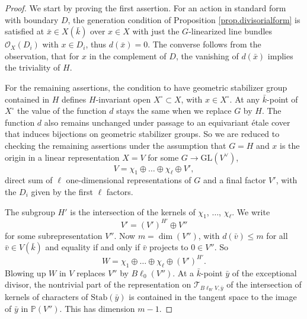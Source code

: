 \documentclass[10pt,a4paper]{amsart}
\newcommand{\GL}{{\mathrm{GL}}}
\newcommand{\bP}{{\mathbb P}}
\newcommand{\cO}{{\mathcal O}}
\begin{document}
\begin{proof}
We start by proving the first assertion.
For an action in standard form with boundary $D$, the generation condition of Proposition \ref{prop.divisorialform} is satisfied at $\bar x\in X(\bar k)$
over $x\in X$ with just the $G$-linearized line bundles $\cO_X(D_i)$ with $x\in D_i$,
thus $d(\bar x)=0$.
The converse follows from the observation, that for $x$ in the complement of $D$, the vanishing of $d(\bar x)$ implies the triviality of $H$.

For the remaining assertions, the condition to have geometric stabilizer group contained in $H$ defines $H$-invariant open $X^\circ\subset X$, with $x\in X^\circ$.
At any $\bar k$-point of $X^\circ$ the value of the function $d$ stays the same when we replace $G$ by $H$.
The function $d$ also remains unchanged under passage to an equivariant \'etale cover that induces bijections on geometric stabilizer groups.
So we are reduced to checking the remaining assertions under the assumption that
$G=H$ and
$x$ is the origin in a linear representation $X=V$ for some $G\to \GL(V^\vee)$,
\[ V=\chi_1\oplus\dots\oplus \chi_\ell\oplus V', \]
direct sum of $\ell$ one-dimensional representations of $G$
and a final factor $V'$, with
the $D_i$ given by the first $\ell$ factors.

The subgroup $H'$ is
the intersection of the kernels of $\chi_1$, $\dots$, $\chi_\ell$.
We write
\[ V'=(V')^{H'}\oplus V'' \]
for some subrepresentation $V''$.
Now $m=\dim(V'')$, with
$d(\bar v)\le m$ for all $\bar v\in V(\bar k)$ and equality if and only if $\bar v$ projects to $0\in V''$.
So
\[ W=\chi_1\oplus \dots\oplus \chi_\ell \oplus (V')^{H'}. \]
Blowing up $W$ in $V$ replaces $V''$ by
$B\ell_0(V'')$.
At a $\bar k$-point $\bar y$ of the exceptional divisor,
the nontrivial part of the representation on $\mathcal{T}_{B\ell_WV,\bar y}$ of the intersection of kernels of characters of $\mathrm{Stab}(\bar y)$ is contained in the tangent space to the image of $\bar y$ in $\bP(V'')$.
This has dimension $m-1$.
\end{proof}
\end{document}
